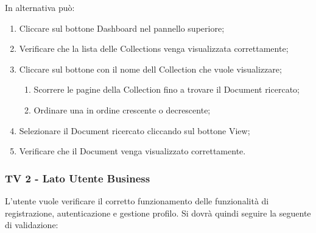 In alternativa può:
\begin{enumerate}
\item Cliccare sul bottone Dashboard nel pannello superiore;
\item  Verificare che la lista delle Collections venga visualizzata correttamente;
\item Cliccare sul bottone con il nome dell Collection che vuole visualizzare;
\begin{enumerate}
\item Scorrere le pagine della Collection fino a trovare il Document ricercato;
\item Ordinare una  in ordine crescente o decrescente;
\end{enumerate}
\item Selezionare il Document ricercato cliccando sul bottone View;
\item Verificare che il Document venga visualizzato correttamente.
\end{enumerate}

\subsubsection{TV 2 - Lato Utente Business}
L'utente vuole verificare il corretto funzionamento delle funzionalità di registrazione, autenticazione e gestione profilo.
Si dovrà quindi seguire la seguente  di validazione:

